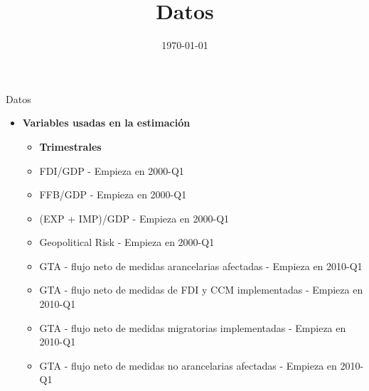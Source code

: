 \documentclass[10pt]{beamer}
\title{Datos}
\date[\textcolor{white}{\today}]{\today}
\begin{document}
\frame{\titlepage}

\begin{frame}{Datos}
\begin{itemize}
\item \textbf{Variables usadas en la estimación}
   \begin{itemize}
   \item \textbf{Trimestrales}
   \item FDI/GDP - Empieza en 2000-Q1
   \item FFB/GDP - Empieza en 2000-Q1
   \item (EXP + IMP)/GDP - Empieza en 2000-Q1
   \item Geopolitical Risk - Empieza en 2000-Q1
   \item GTA - flujo neto de medidas arancelarias afectadas - Empieza en 2010-Q1
   \item GTA - flujo neto de medidas de FDI y CCM implementadas - Empieza en 2010-Q1 
   \item GTA - flujo neto de medidas migratorias implementadas - Empieza en 2010-Q1 
   \item GTA - flujo neto de medidas no arancelarias afectadas - Empieza en 2010-Q1
   \end{itemize}
\end{itemize}
\end{frame}
\end{document}
